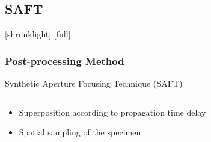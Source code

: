 \subsection{SAFT}
[shrunklight]
[full]
\begin{frame}[t]
\frametitle{Post-processing Method} 
	Synthetic Aperture Focusing Technique (SAFT)
	\begin{columns}[t]
	\begin{column}{0.48\textwidth}
	\begin{center}
		\begin{itemize}
		\item Superposition according to propagation time delay
		\item Spatial sampling of the specimen
		\end{itemize}
	\end{center}
	\end{column}	
	\begin{column}{0.52\textwidth}
	\vspace*{-0.3cm}
	\begin{center}
	\end{center}
	\end{column}
	\end{columns}	
\end{frame}

